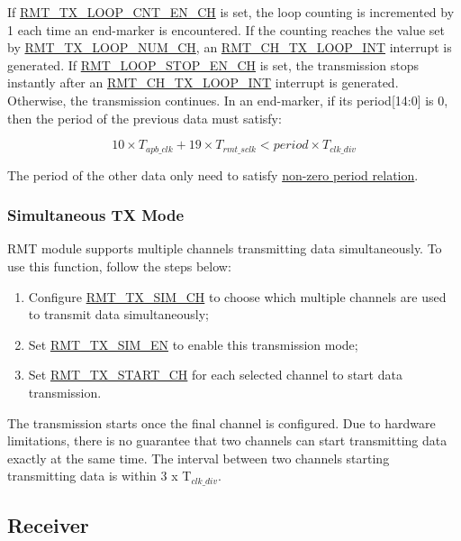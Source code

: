 \documentclass[main\_\_EN.tex]{subfiles}
\begin{document}
If \hyperref[fielddesc:RMTTXLOOPCNTENCHN]{RMT\_TX\_LOOP\_CNT\_EN\_CH} is set, the loop counting is incremented by 1 each time an end-marker is encountered. If the counting reaches the value set by \hyperref[fielddesc:RMTTXLOOPNUMCHN]{RMT\_TX\_LOOP\_NUM\_CH}, an \hyperref[int:RMTCHNTXLOOPINT]{RMT\_CH\_TX\_LOOP\_INT} interrupt is generated. If \hyperref[fielddesc:RMTLOOPSTOPENCHN]{RMT\_LOOP\_STOP\_EN\_CH} is set, the transmission stops instantly after an \hyperref[int:RMTCHNTXLOOPINT]{RMT\_CH\_TX\_LOOP\_INT} interrupt is generated. Otherwise, the transmission continues. In an end-marker, if its period[14:0] is 0, then the period of the previous data must satisfy:

\begin{equation}
10 \times T_{apb\_clk} + 19 \times T_{rmt\_sclk} < period \times T_{clk\_div}
\end{equation}

The period of the other data only need to satisfy \hyperref[eq:rmt-period-value]{non-zero period relation}.


\subsubsection{Simultaneous TX Mode}

RMT module supports multiple channels transmitting data simultaneously. To use this function, follow the steps below:

\begin{enumerate}
    \item Configure \hyperref[regdesc:RMTTXSIMREG]{RMT\_TX\_SIM\_CH} to choose which multiple channels are used to transmit data simultaneously;
    \item Set \hyperref[fielddesc:RMTTXSIMEN]{RMT\_TX\_SIM\_EN} to enable this transmission mode;
    \item Set \hyperref[fielddesc:RMTTXSTARTCHN]{RMT\_TX\_START\_CH} for each selected channel to start data transmission.
\end{enumerate}

The transmission starts once the final channel is configured. Due to hardware limitations, there is no guarantee that two channels can start transmitting data exactly at the same time. The interval between two channels starting transmitting data is within 3 x T$_{clk\_div}$.


\subsection{Receiver}
\end{document}
